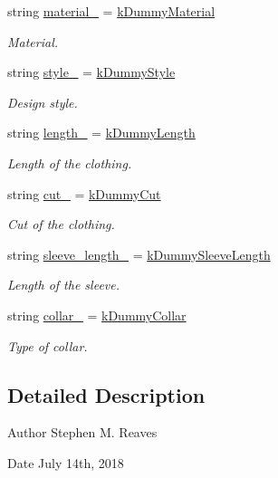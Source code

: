 \begin{DoxyCompactItemize}
string \mbox{\hyperlink{classClothes_adbb9ed311f14ccbb1e4fe0e8378a95d4}{material\+\_\+}} = \mbox{\hyperlink{clothes_8h_a9df1268c6668ae4e2a728ccf032cc33d}{k\+Dummy\+Material}}
\begin{DoxyCompactList}\small\item\em Material. \end{DoxyCompactList}\item 
string \mbox{\hyperlink{classClothes_aa85ed2b95110d8c477a1aca9cb403f98}{style\+\_\+}} = \mbox{\hyperlink{clothes_8h_a9deec6ed1f40928bfa0040eeab95ed6b}{k\+Dummy\+Style}}
\begin{DoxyCompactList}\small\item\em Design style. \end{DoxyCompactList}\item 
string \mbox{\hyperlink{classClothes_ae02603eda727e33caf46ec30e761e3c3}{length\+\_\+}} = \mbox{\hyperlink{clothes_8h_a1624256dcecfb0995a74c36142593770}{k\+Dummy\+Length}}
\begin{DoxyCompactList}\small\item\em Length of the clothing. \end{DoxyCompactList}\item 
string \mbox{\hyperlink{classClothes_ac1c2286c8928a5eee91d818a098a44ac}{cut\+\_\+}} = \mbox{\hyperlink{clothes_8h_a8a6eb066049b009439505355aeaae375}{k\+Dummy\+Cut}}
\begin{DoxyCompactList}\small\item\em Cut of the clothing. \end{DoxyCompactList}\item 
string \mbox{\hyperlink{classClothes_a012aeb71e62ebaf9b5b5dd700cc8d5db}{sleeve\+\_\+length\+\_\+}} = \mbox{\hyperlink{clothes_8h_a0f53dde6a2c4c344bb7da50655497350}{k\+Dummy\+Sleeve\+Length}}
\begin{DoxyCompactList}\small\item\em Length of the sleeve. \end{DoxyCompactList}\item 
string \mbox{\hyperlink{classClothes_ae2e5026257b3a2f2ddbf61757fd3b57b}{collar\+\_\+}} = \mbox{\hyperlink{clothes_8h_ac06c9f556f68bcd2829e36c55b70a86e}{k\+Dummy\+Collar}}
\begin{DoxyCompactList}\small\item\em Type of collar. \end{DoxyCompactList}\end{DoxyCompactItemize}


\subsection{Detailed Description}
\begin{DoxyAuthor}{Author}
Stephen M. Reaves 
\end{DoxyAuthor}
\begin{DoxyDate}{Date}
July 14th, 2018 
\end{DoxyDate}


